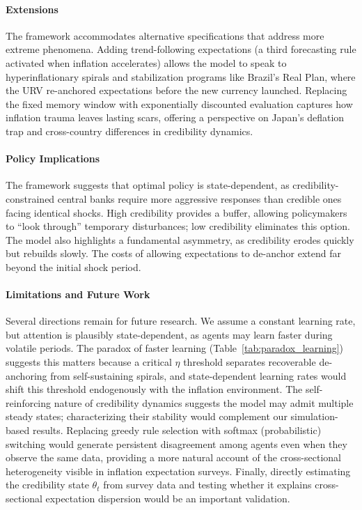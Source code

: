 \documentclass[10pt]{article}
\begin{document}
\paragraph{Extensions} The framework accommodates alternative specifications that address more extreme phenomena. Adding trend-following expectations (a third forecasting rule activated when inflation accelerates) allows the model to speak to hyperinflationary spirals and stabilization programs like Brazil's Real Plan, where the URV re-anchored expectations before the new currency launched. Replacing the fixed memory window with exponentially discounted evaluation captures how inflation trauma leaves lasting scars, offering a perspective on Japan's deflation trap and cross-country differences in credibility dynamics.

\paragraph{Policy Implications} The framework suggests that optimal policy is state-dependent, as credibility-constrained central banks require more aggressive responses than credible ones facing identical shocks. High credibility provides a buffer, allowing policymakers to ``look through'' temporary disturbances; low credibility eliminates this option. The model also highlights a fundamental asymmetry, as credibility erodes quickly but rebuilds slowly. The costs of allowing expectations to de-anchor extend far beyond the initial shock period.

\paragraph{Limitations and Future Work} Several directions remain for future research. We assume a constant learning rate, but attention is plausibly state-dependent, as agents may learn faster during volatile periods. The paradox of faster learning (Table~\ref{tab:paradox_learning}) suggests this matters because a critical $\eta$ threshold separates recoverable de-anchoring from self-sustaining spirals, and state-dependent learning rates would shift this threshold endogenously with the inflation environment. The self-reinforcing nature of credibility dynamics suggests the model may admit multiple steady states; characterizing their stability would complement our simulation-based results. Replacing greedy rule selection with softmax (probabilistic) switching would generate persistent disagreement among agents even when they observe the same
   data, providing a more natural account of the cross-sectional heterogeneity visible in inflation expectation surveys. Finally, directly estimating the credibility state $\theta_t$ from survey data and testing whether it explains cross-sectional expectation dispersion would be an important validation.
\end{document}
